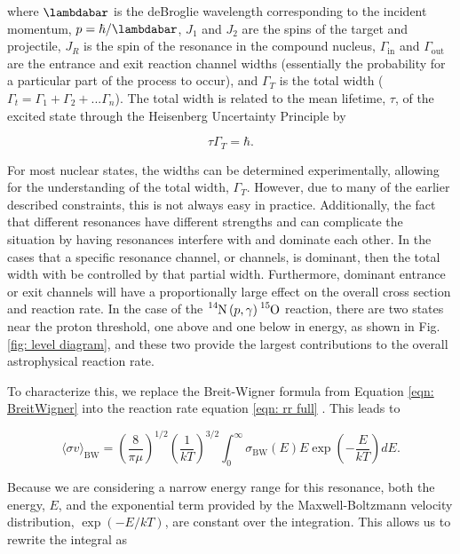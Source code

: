 where $\lambdabar$ is the deBroglie wavelength corresponding to the incident momentum, $p=\hbar/\lambdabar$, $J_1$ and $J_2$ are the spins of the target and projectile, $J_R$ is the spin of the resonance in the compound nucleus, $\Gamma_\mathrm{in}$ and $\Gamma_\mathrm{out}$ are the entrance and exit reaction channel widths (essentially the probability for a particular part of the process to occur), and $\Gamma_T$ is the total width ($\Gamma_t = \Gamma_1 + \Gamma_2 + ... \Gamma_n$). The total width is related to the mean lifetime, $\tau$, of the excited state through the Heisenberg Uncertainty Principle by 

\begin{equation}
\tau \Gamma_{T} = \hbar.
\label{eqn: width to lifetime}
\end{equation}

For most nuclear states, the widths can be determined experimentally, allowing for the understanding of the total width, $\Gamma_{T}$. However, due to many of the earlier described constraints, this is not always easy in practice. Additionally, the fact that different resonances have different strengths and can complicate the situation by having resonances interfere with and dominate each other. In the cases that a specific resonance channel, or channels, is dominant, then the total width with be controlled by that partial width. Furthermore, dominant entrance or exit channels will have a proportionally large effect on the overall cross section and reaction rate. In the case of the $\ce{^{14}N} \left( p, \gamma \right) \ce{^{15}O}$ reaction, there are two states near the proton threshold, one above and one below in energy, as shown in Fig. \ref{fig: level diagram}, and these two provide the largest contributions to the overall astrophysical reaction rate.

To characterize this, we replace the Breit-Wigner formula from Equation \ref{eqn: BreitWigner} into the reaction rate equation \ref{eqn: rr full} \cite{IliadisBook}. This leads to 

\begin{equation}
\langle \sigma v \rangle_{\text{BW}} = \left( \frac{8}{\pi \mu} \right) ^{1/2} \left( \frac{1}{kT} \right) ^{3/2} \int_{0}^{\infty} \sigma_{\text{BW} }(E) E \exp \left(-\dfrac{E}{kT} \right) dE.
\label{eqn: reaction rate BW}
\end{equation}

\noindent Because we are considering a narrow energy range for this resonance, both the energy, $E$, and the exponential term provided by the Maxwell-Boltzmann velocity distribution, $\exp \left( -E / kT \right)$, are constant over the integration. This allows us to rewrite the integral as


